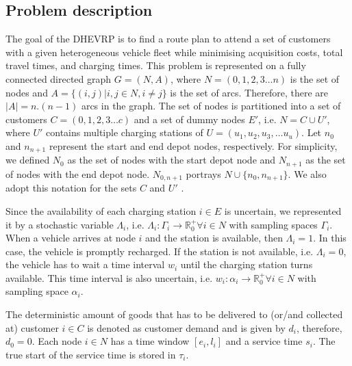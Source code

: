\documentclass[11pt]{article}
\begin{document}
\subsection{Problem description}
The goal of the DHEVRP is to find a route plan to attend a set of customers with a given heterogeneous vehicle fleet while minimising acquisition costs, total travel times, and charging times. This problem is represented on a fully connected directed graph $G = (N, A)$, where $N = (0,1, 2, 3 \dots n)$ is the set of nodes and $A = \{(i, j) |  i, j \in N, i \neq j \}$ is the set of arcs. Therefore, there are $|A| = n.(n-1)$ arcs in the graph. The set of nodes is partitioned into a set of customers $C = (0,1, 2, 3 \dots c)$ and a set of dummy nodes $E'$, i.e. $N = C \cup U'$, where $U'$ contains multiple charging stations of $U = (u_1, u_2, u_3, \dots u_u)$. Let $n_0$ and $n_{n+1}$ represent the start and end depot nodes, respectively. For simplicity, we defined $N_0$ as the set of nodes with the start depot node and $N_{n+1}$ as the set of nodes with the end depot node. $N_{0, n+1}$ portrays $N \cup \{n_0, n_{n+1}\}$. We also adopt this notation for the sets $C$ and $U'$ \citep{Hiermann2016}.

Since the availability of each charging station $i \in E$ is uncertain, we represented it by a stochastic variable $\Lambda_i$, i.e. $\Lambda_i:\Gamma_{i} \to \mathbb{R}_0^+ \forall i \in N$ with sampling spaces $\Gamma_{i}$. When a vehicle arrives at node $i$ and the station is available, then $\Lambda_i = 1$. In this case, the vehicle is promptly recharged. If the station is not available, i.e. $\Lambda_i = 0$, the vehicle has to wait a time interval $w_i$ until the charging station turns available. This time interval is also uncertain, i.e. $w_i:\alpha_{i} \to \mathbb{R}_0^+ \forall i \in N$ with sampling space $\alpha_{i}$. 

The deterministic amount of goods that has to be delivered to (or/and collected at) customer $i \in C$ is denoted as customer demand and is given by $d_i$, therefore, $d_0 = 0$. Each node $i \in N$ has a time window $[e_i, l_i]$ and a service time $s_i$. The true start of the service time is stored in $\tau_i$.
\end{document}
